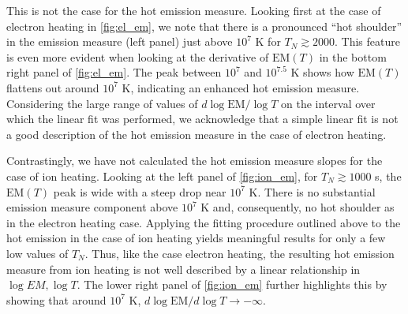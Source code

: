 \documentclass[tighten,apj]{emulateapj}
\begin{document}
	\par This is not the case for the hot emission measure. Looking first at the case of electron heating in \autoref{fig:el_em}, we note that there is a pronounced ``hot shoulder'' in the emission measure (left panel) just above $10^7$ K for $T_N\gtrsim2000$. This feature is even more evident when looking at the derivative of $\mathrm{EM}(T)$ in the bottom right panel of \autoref{fig:el_em}. The peak between $10^7$ and $10^{7.5}$ K shows how $\mathrm{EM}(T)$ flattens out around $10^7$ K, indicating an enhanced hot emission measure. Considering the large range of values of $d\log{\mathrm{EM}}/\log{T}$ on the interval over which the linear fit was performed, we acknowledge that a simple linear fit is not a good description of the hot emission measure in the case of electron heating.
	\par Contrastingly, we have not calculated the hot emission measure slopes for the case of ion heating. Looking at the left panel of \autoref{fig:ion_em}, for $T_N\gtrsim1000$ s, the $\mathrm{EM}(T)$ peak is wide with a steep drop near $10^7$ K. There is no substantial emission measure component above $10^7$ K and, consequently, no hot shoulder as in the electron heating case. Applying the fitting procedure outlined above to the hot emission in the case of ion heating yields meaningful results for only a few low values of $T_N$. Thus, like the case electron heating, the resulting hot emission measure from ion heating is not well described by a linear relationship in $\log{EM},\log{T}$. The lower right panel of \autoref{fig:ion_em} further highlights this by showing that around $10^7$ K, $d\log{\mathrm{EM}}/d\log{T}\to-\infty$.
\end{document}
